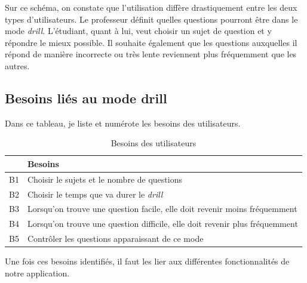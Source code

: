 
Sur ce schéma, on constate que l'utilisation diffère drastiquement entre les deux types d'utilisateurs. Le professeur définit quelles questions pourront être dans le mode \emph{drill}. L'étudiant, quant à lui, veut choisir un sujet de question et y répondre le mieux possible. Il souhaite également que les questions auxquelles il répond de manière incorrecte ou très lente reviennent plus fréquemment que les autres.

\subsection*{Besoins liés au mode drill}
Dans ce tableau, je liste et numérote les besoins des utilisateurs.
\begin{table}[h]
    \begin{center}
        \caption{Besoins des utilisateurs \label{Besoins}}
        \begin{tabular}{|l|l|}
            \hline
            \textbf{} & \textbf{Besoins}                                                            \\
            \hline
            B1        & Choisir le sujets et le nombre de questions                                 \\
            \hline
            B2        & Choisir le temps que va durer le \emph{drill}                               \\
            \hline
            B3        & Lorsqu'on trouve une question facile, elle doit revenir moins fréquemment   \\
            \hline
            B4        & Lorsqu'on trouve une question difficile, elle doit revenir plus fréquemment \\
            \hline
            B5        & Contrôler les questions apparaissant de ce mode                             \\
            \hline
        \end{tabular}
    \end{center}
\end{table}

Une fois ces besoins identifiés, il faut les lier aux différentes fonctionnalités de notre application.


